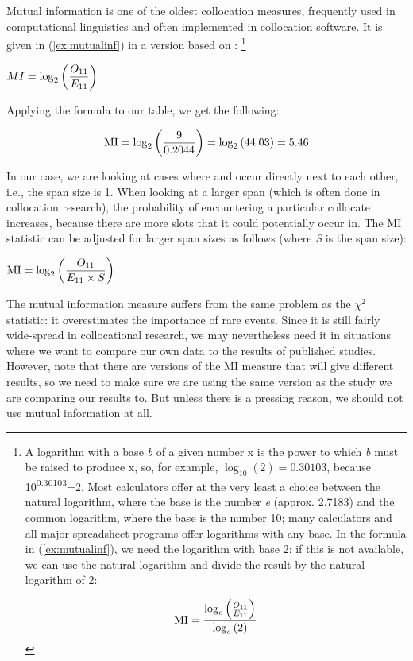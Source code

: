 Mutual information  is one of the oldest collocation  measures, frequently used in computational linguistics and often implemented in collocation software. It is given in (\ref{ex:mutualinf}) in a version based on \citet{church_word_1990}: \footnote{A logarithm  with a base \textit{b} of a given number x is the power to which \textit{b} must be raised to produce x, so, for example, $\log_{10}(2) = 0.30103$, because 10\textsuperscript{0.30103}=2. Most calculators offer at the very least a choice between the natural logarithm, where the base is the number \textit{e} (approx. 2.7183) and the common logarithm,  where the base is the number 10; many calculators and all major spreadsheet programs offer logarithms with any base. In the formula in (\ref{ex:mutualinf}), we need the logarithm with base 2; if this is not available, we can use the natural logarithm and divide the result by the natural logarithm of 2:

\[\text{MI} = {{\log_e \left( {O_{11}} \over {E_{11}} \right)} \over {\log_e \left( 2 \right)}}\]}

\begin{exe}
\ex $\displaystyle{MI = {\log_2 \left( {O_{11}} \over {E_{11}} \right)}}$
\label{ex:mutualinf}
\end{exe}

Applying the formula to our table, we get the following:

\[\text{MI} = {\log_2 \left( {9} \over {0.2044} \right) = \log_2 \left( 44.03 \right)} = 5.46\]

In our case, we are looking at cases where  and  occur directly next to each other, i.e., the span  size is 1. When looking at a larger span (which is often done in collocation  research), the probability  of encountering a particular collocate increases, because there are more slots that it could potentially occur in. The MI statistic can be adjusted for larger span sizes as follows (where \textit{S} is the span size):

\begin{exe}
\ex $\displaystyle{\text{MI} = {\log_2 \left( {O_{11}} \over {E_{11} \times S} \right)}}$
\label{ex:mutualinfspan}
\end{exe}

The mutual information  measure suffers from the same problem as the $\chi^2$  statistic:  it overestimates the importance of rare events. Since it is still fairly wide\hyp{}spread in collocational  research, we may nevertheless need it in situations where we want to compare our own data to the results of published studies. However, note that there are versions of the MI measure that will give different results, so we need to make sure we are using the same version as the study we are comparing our results to. But unless there is a pressing reason, we should not use mutual information  at all.


